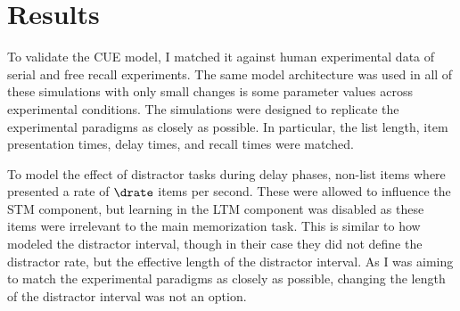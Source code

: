 \chapter{Results}
To validate the CUE model, I matched it against human experimental data of serial and free recall experiments.
The same model architecture was used in all of these simulations with only small changes is some parameter values across experimental conditions.
The simulations were designed to replicate the experimental paradigms as closely as possible.
In particular, the list length, item presentation times, delay times, and recall times were matched.

To model the effect of distractor tasks during delay phases, non-list items where presented a rate of $\drate$ items per second.
These were allowed to influence the STM component, but learning in the LTM component was disabled as these items were irrelevant to the main memorization task.
This is similar to how \textcite{Howard2002} modeled the distractor interval, though in their case they did not define the distractor rate, but the effective length of the distractor interval.
As I was aiming to match the experimental paradigms as closely as possible, changing the length of the distractor interval was not an option.

